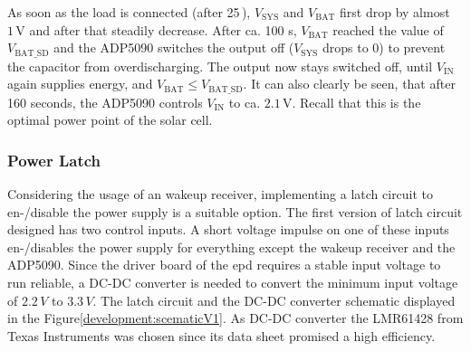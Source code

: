As soon as the load is connected (after 25\,), $V_{\text{SYS}}$ and $V_{\text{BAT}}$ first drop by almost $1\,\text{V}$ and after that steadily decrease.
After ca. 100 s, $V_{\text{BAT}}$ reached the value of $V_{\text{BAT\_SD}}$ and the ADP5090 switches the output off ($V_{\text{SYS}}$ drops to 0) to prevent the capacitor from overdischarging.
The output now stays switched off, until $V_{\text{IN}}$ again supplies energy, and $V_{\text{BAT}} \le V_{\text{BAT\_SD}}$.
It can also clearly be seen, that after 160 seconds, the ADP5090 controls $V_{\text{IN}}$ to ca. $2.1\,\text{V}$. Recall that this is the optimal power point of the solar cell.

\subsubsection{Power Latch}
Considering the usage of an wakeup receiver, implementing a latch circuit to en-/disable the power supply is a suitable option. The first version of latch circuit designed has two control inputs. A short voltage impulse on one of these inputs en-/disables the power supply for everything except the wakeup receiver and the ADP5090. Since the driver board of the \acs{epd} requires a stable input voltage to run reliable, a DC-DC converter is needed to convert the minimum input voltage of $2.2\,V$ to $3.3\,V$. The latch circuit and the DC-DC converter schematic displayed in the Figure\ref{development:scematicV1}. As DC-DC converter the LMR61428 from Texas Instruments was chosen since its data sheet promised a high efficiency.

